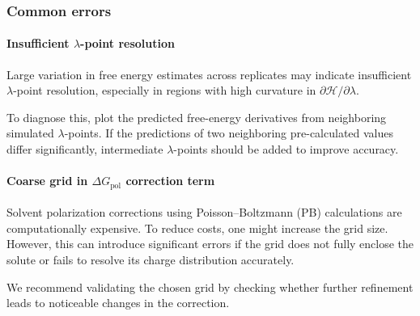 \subsubsection{Common errors}

\paragraph{Insufficient $\lambda$-point resolution}
Large variation in free energy estimates across replicates may indicate insufficient $\lambda$-point resolution, especially in regions with high curvature in $\partial\mathcal{H}/\partial\lambda$.

To diagnose this, plot the predicted free-energy derivatives from neighboring simulated $\lambda$-points. If the predictions of two neighboring pre-calculated values differ significantly, intermediate $\lambda$-points should be added to improve accuracy.

\paragraph{Coarse grid in $\Delta G_{\text{pol}}$ correction term}
Solvent polarization corrections using Poisson–Boltzmann (PB) calculations are computationally expensive.
To reduce costs, one might increase the grid size. However, this can introduce significant errors if the grid does not fully enclose the solute or fails to resolve its charge distribution accurately.

We recommend validating the chosen grid by checking whether further refinement leads to noticeable changes in the correction.


